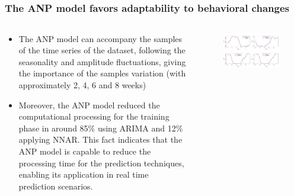 \documentclass[aspectratio=169]{beamer}
\begin{document}
\subsection{}
\begin{frame}
\frametitle{The ANP model favors adaptability to behavioral changes}
\small

\begin{columns}[T] %
\begin{column}{.4\textwidth}
\begin{itemize}\footnotesize
    \item The ANP model can accompany the samples of the time series of the dataset, following the seasonality and amplitude fluctuations, giving the importance of the samples variation (with approximately 2, 4, 6 and 8 weeks)
    \item Moreover, the ANP model reduced the computational processing for the training phase in around 85\% using ARIMA and 12\% applying NNAR. This fact indicates that the ANP model is capable to reduce the processing time for the prediction techniques, enabling its application in real time prediction scenarios.
\end{itemize}
\end{column}%

\hfill%

\begin{column}{.6\textwidth}
\centering
\begin{figure}[!htb]
\centering
\includegraphics[height=0.62\textwidth,angle=0]{melhoresCiclos3_3-eps-converted-to.pdf}
\end{figure}
\end{column}%
\end{columns}

\end{frame}
\end{document}

